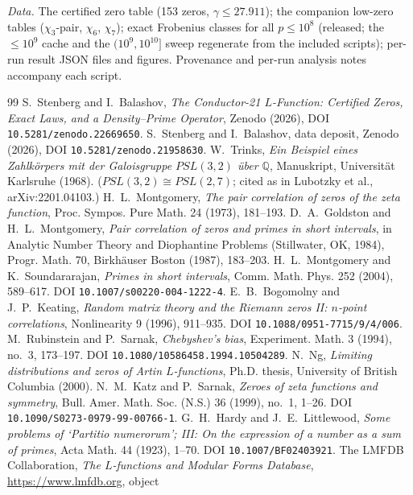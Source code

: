 \documentclass[11pt]{article}
\begin{document}
\emph{Data.} The certified zero table (153 zeros, $\gamma\le27.911$); the
companion low-zero tables ($\chi_3$-pair, $\chi_6$, $\chi_7$); exact
Frobenius classes for all $p\le10^8$ (released; the $\le10^9$ cache and the
$(10^9,10^{10}]$ sweep regenerate from the included scripts); per-run result
JSON files and figures. Provenance and per-run analysis notes accompany each
script.

\begin{thebibliography}{99}
 S.~Stenberg and I.~Balashov, \emph{The Conductor-21
$L$-Function: Certified Zeros, Exact Laws, and a Density--Prime Operator},
Zenodo (2026), DOI \texttt{10.5281/zenodo.22669650}.
 S.~Stenberg and I.~Balashov, data deposit, Zenodo
(2026), DOI \texttt{10.5281/zenodo.21958630}.
 W.~Trinks, \emph{Ein Beispiel eines Zahlk\"orpers mit der
Galoisgruppe $PSL(3,2)$ \"uber $\mathbb Q$}, Manuskript, Universit\"at
Karlsruhe (1968). ($PSL(3,2)\cong PSL(2,7)$; cited as in Lubotzky et al.,
arXiv:2201.04103.)
 H.~L.~Montgomery, \emph{The pair correlation of zeros of
the zeta function}, Proc. Sympos. Pure Math. 24 (1973), 181--193.
 D.~A.~Goldston and H.~L.~Montgomery, \emph{Pair correlation of
zeros and primes in short intervals}, in Analytic Number Theory and
Diophantine Problems (Stillwater, OK, 1984), Progr. Math. 70, Birkh\"auser
Boston (1987), 183--203.
 H.~L.~Montgomery and K.~Soundararajan, \emph{Primes in short
intervals}, Comm. Math. Phys. 252 (2004), 589--617.
DOI \texttt{10.1007/s00220-004-1222-4}.
 E.~B.~Bogomolny and J.~P.~Keating, \emph{Random matrix theory
and the Riemann zeros II: $n$-point correlations}, Nonlinearity 9 (1996),
911--935. DOI \texttt{10.1088/0951-7715/9/4/006}.
 M.~Rubinstein and P.~Sarnak, \emph{Chebyshev's bias},
Experiment. Math. 3 (1994), no.~3, 173--197.
DOI \texttt{10.1080/10586458.1994.10504289}.
 N.~Ng, \emph{Limiting distributions and zeros of Artin
$L$-functions}, Ph.D. thesis, University of British Columbia (2000).
 N.~M.~Katz and P.~Sarnak, \emph{Zeroes of zeta functions and
symmetry}, Bull. Amer. Math. Soc. (N.S.) 36 (1999), no.~1, 1--26.
DOI \texttt{10.1090/S0273-0979-99-00766-1}.
 G.~H.~Hardy and J.~E.~Littlewood, \emph{Some problems of
`Partitio numerorum'; III: On the expression of a number as a sum of
primes}, Acta Math. 44 (1923), 1--70. DOI \texttt{10.1007/BF02403921}.
 The LMFDB Collaboration, \emph{The $L$-functions and Modular
Forms Database}, \url{https://www.lmfdb.org}, object

\end{thebibliography}
\end{document}
